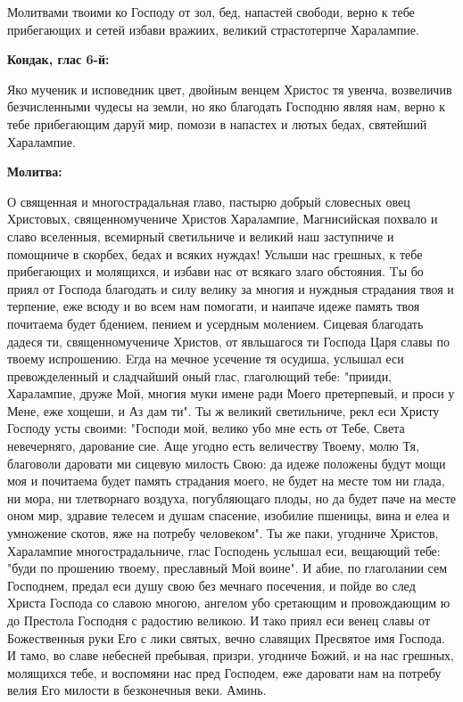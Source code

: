 Молитвами твоими ко Господу от зол, бед, напастей свободи, верно к тебе прибегающих и сетей избави вражиих, великий страстотерпче Харалампие.


\medskip


\bfseries Кондак, глас 6-й:\normalfont{}


Яко мученик и исповедник цвет, двойным венцем Христос тя увенча, возвеличив безчисленными чудесы на земли, но яко благодать Господню являя нам, верно к тебе прибегающим даруй мир, помози в напастех и лютых бедах, святейший Харалампие.


\medskip


\bfseries Молитва:\normalfont{}


О священная и многострадальная главо, пастырю добрый словесных овец Христовых, священномучениче Христов Харалампие, Магнисийская похвало и славо вселенныя, всемирный светильниче и великий наш заступниче и помощниче в скорбех, бедах и всяких нуждах! Услыши нас грешных, к тебе прибегающих и молящихся, и избави нас от всякаго злаго обстояния.  Tы бо приял от Господа благодать и силу велику за многия и нуждныя страдания твоя и терпение, еже всюду и во всем нам помогати, и наипаче идеже память твоя почитаема будет бдением, пением и усердным молением. Сицевая благодать дадеся ти, священномучениче Христов, от явльшагося ти Господа Царя славы по твоему испрошению. Eгда на мечное усечение тя осудиша, услышал еси превожделенный и сладчайший оный глас, глаголющий тебе: "прииди, Харалампие, друже Мой, многия муки имене ради Моего претерпевый, и проси у Мене, еже хощеши, и Аз дам ти". Ты ж великий светильниче, рекл еси Христу Господу усты своими:  "Господи мой, велико убо мне есть от Тебе, Света невечерняго, дарование сие. Аще угодно есть величеству Твоему, молю Тя, благоволи даровати ми сицевую милость Свою: да идеже положены будут мощи моя и почитаема будет память страдания моего, не будет на месте том ни глада, ни мора, ни тлетворнаго воздуха, погубляющаго плоды, но да будет паче на месте оном мир, здравие телесем и душам спасение, изобилие пшеницы, вина и елеа и умножение скотов, яже на потребу человеком". Ты же паки, угодниче Христов, Харалампие многострадальниче, глас Господень услышал еси, вещающий тебе: "буди по прошению твоему, преславный Мой воине". И абие, по глаголании сем Господнем, предал еси душу свою без мечнаго посечения, и пойде во след Христа Господа со славою многою, ангелом убо сретающим и провождающим ю до Престола Господня с радостию великою. И тако приял еси венец славы от Божественныя руки Его с лики святых, вечно славящих Пресвятое имя Господа. И тамо, во славе небесней пребывая, призри, угодниче Божий, и на нас грешных, молящихся тебе, и воспомяни нас пред Господем, еже даровати нам на потребу велия Его милости в безконечныя веки. Аминь.



